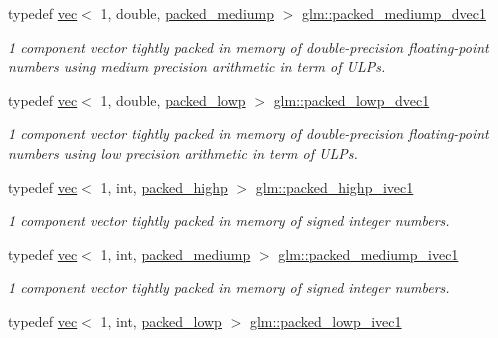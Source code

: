 \begin{DoxyCompactItemize}
typedef \hyperlink{structglm_1_1vec}{vec}$<$ 1, double, \hyperlink{namespaceglm_a36ed105b07c7746804d7fdc7cc90ff25a9604654c3b137cd7898689fd34b25bc0}{packed\+\_\+mediump} $>$ \hyperlink{group__gtc__type__aligned_gaf34b2d86391c45507ccc7c605992b8d3}{glm\+::packed\+\_\+mediump\+\_\+dvec1}
\begin{DoxyCompactList}\small\item\em 1 component vector tightly packed in memory of double-\/precision floating-\/point numbers using medium precision arithmetic in term of U\+L\+Ps. \end{DoxyCompactList}\item 
typedef \hyperlink{structglm_1_1vec}{vec}$<$ 1, double, \hyperlink{namespaceglm_a36ed105b07c7746804d7fdc7cc90ff25ac36a4bd74559be2c0b65bc48e5953b8b}{packed\+\_\+lowp} $>$ \hyperlink{group__gtc__type__aligned_gab43886895b98688f4ebbc395e5a633ff}{glm\+::packed\+\_\+lowp\+\_\+dvec1}
\begin{DoxyCompactList}\small\item\em 1 component vector tightly packed in memory of double-\/precision floating-\/point numbers using low precision arithmetic in term of U\+L\+Ps. \end{DoxyCompactList}\item 
typedef \hyperlink{structglm_1_1vec}{vec}$<$ 1, int, \hyperlink{namespaceglm_a36ed105b07c7746804d7fdc7cc90ff25a8e8791ee77fe079b1291f710d88031bf}{packed\+\_\+highp} $>$ \hyperlink{group__gtc__type__aligned_ga7fde67656fb5726169114054992f0a3f}{glm\+::packed\+\_\+highp\+\_\+ivec1}
\begin{DoxyCompactList}\small\item\em 1 component vector tightly packed in memory of signed integer numbers. \end{DoxyCompactList}\item 
typedef \hyperlink{structglm_1_1vec}{vec}$<$ 1, int, \hyperlink{namespaceglm_a36ed105b07c7746804d7fdc7cc90ff25a9604654c3b137cd7898689fd34b25bc0}{packed\+\_\+mediump} $>$ \hyperlink{group__gtc__type__aligned_ga2086cbb8b85fe406f4be46fdff491304}{glm\+::packed\+\_\+mediump\+\_\+ivec1}
\begin{DoxyCompactList}\small\item\em 1 component vector tightly packed in memory of signed integer numbers. \end{DoxyCompactList}\item 
typedef \hyperlink{structglm_1_1vec}{vec}$<$ 1, int, \hyperlink{namespaceglm_a36ed105b07c7746804d7fdc7cc90ff25ac36a4bd74559be2c0b65bc48e5953b8b}{packed\+\_\+lowp} $>$ \hyperlink{group__gtc__type__aligned_ga259a03c1d585f918f04230dde51cc95a}{glm\+::packed\+\_\+lowp\+\_\+ivec1}

\end{DoxyCompactItemize}
